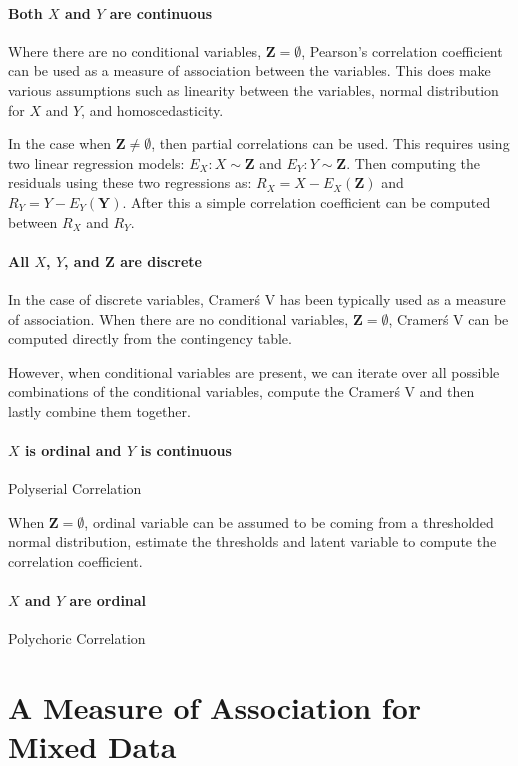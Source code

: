 \documentclass[letterpaper]{article} %
\begin{document}
\paragraph{Both $ X $ and $ Y $ are continuous}
Where there are no conditional variables, $ \bm{Z} = \emptyset $, Pearson's
correlation coefficient can be used as a measure of association between the
variables. This does make various assumptions such as linearity between the
variables, normal distribution for $ X $ and $ Y $, and homoscedasticity.

In the case when $ \bm{Z} \neq \emptyset $, then partial correlations can be
used. This requires using two linear regression models: $ E_X: X \sim \bm{Z} $
and $ E_Y: Y \sim \bm{Z} $. Then computing the residuals using these two
regressions as: $ R_X = X - E_X(\bm{Z}) $ and $ R_Y = Y - E_Y(\bm{Y}) $. After
this a simple correlation coefficient can be computed between $ R_X $ and $ R_Y $.

\paragraph{All $ X $, $ Y $, and $ \bm{Z} $ are discrete}

In the case of discrete variables, Cramer\'s V has been typically used as a
measure of association. When there are no conditional variables, $ \bm{Z} = \emptyset $,
Cramer\'s V can be computed directly from the contingency table.

However, when conditional variables are present, we can iterate over all
possible combinations of the conditional variables, compute the Cramer\'s V and
then lastly combine them together. 

\paragraph{$ X $ is ordinal and $ Y $ is continuous}
Polyserial Correlation

When $ \bm{Z} = \emptyset $, ordinal variable can be assumed to be coming from
a thresholded normal distribution, estimate the thresholds and latent variable
to compute the correlation coefficient.

\paragraph{$ X $ and $ Y $ are ordinal}
Polychoric Correlation

\section{A Measure of Association for Mixed Data}
\label{sec:mixed_association}
\end{document}
